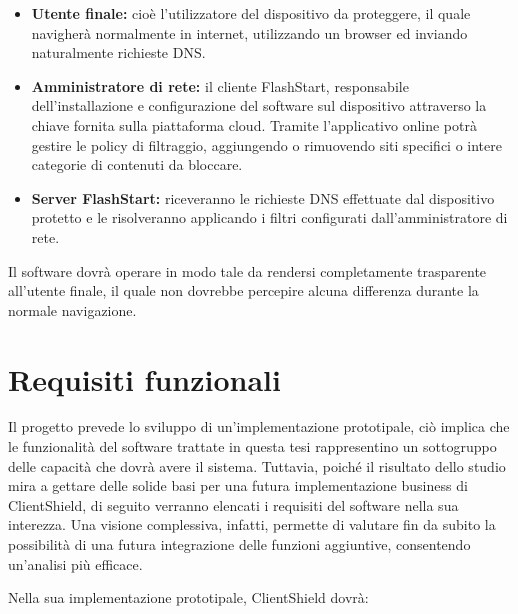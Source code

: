 \documentclass[12pt,a4paper,openright,twoside]{book}
\begin{document}
\begin{itemize}
	\item \textbf{Utente finale:} cioè l'utilizzatore del dispositivo da proteggere, il quale navigherà normalmente in internet, utilizzando un browser ed inviando naturalmente richieste \gls{DNS}.
	
	\item \textbf{Amministratore di rete:} il cliente FlashStart, responsabile dell'installazione e configurazione del software sul dispositivo attraverso la chiave fornita sulla piattaforma cloud. 
	Tramite l'applicativo online potrà gestire le policy di filtraggio, aggiungendo o rimuovendo siti specifici o intere categorie di contenuti da bloccare.

	\item \textbf{Server FlashStart:} riceveranno le richieste \gls{DNS} effettuate dal dispositivo protetto e le risolveranno applicando i filtri configurati dall'amministratore di rete.
\end{itemize}
Il software dovrà operare in modo tale da rendersi completamente trasparente all'utente finale, il quale non dovrebbe percepire alcuna differenza durante la normale navigazione.

\section{Requisiti funzionali}

Il progetto prevede lo sviluppo di un'implementazione prototipale, ciò implica che le funzionalità del software trattate in questa tesi rappresentino un sottogruppo delle capacità che dovrà avere il sistema.
Tuttavia, poiché il risultato dello studio mira a gettare delle solide basi per una futura implementazione business di ClientShield, di seguito verranno elencati i requisiti del software nella sua interezza.
Una visione complessiva, infatti, permette di valutare fin da subito la possibilità di una futura integrazione delle funzioni aggiuntive, consentendo un'analisi più efficace.

Nella sua implementazione prototipale, ClientShield dovrà:
\end{document}
